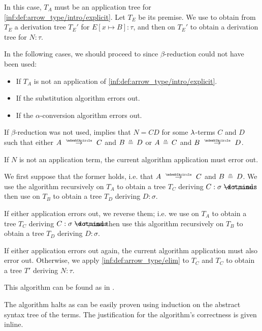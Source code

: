 \begin{algorithm}
\begin{thmenum}
\begin{thmenum}
      In this case, \( T_A \) must be an application tree for \ref{inf:def:arrow_type/intro/explicit}. Let \( T_E \) be its premise. We use  to obtain from \( T_E \) a derivation tree \( T_E' \) for \( E[x \mapsto B]: \tau \), and then  on \( T_E' \) to obtain a derivation tree for \( N: \tau \).

      In the following cases, we should proceed to  since \( \beta \)-reduction could not have been used:
      \begin{itemize}
        \item If \( T_A \) is not an application of \ref{inf:def:arrow_type/intro/explicit}.
        \item If the substitution algorithm errors out.
        \item If the \( \alpha \)-conversion algorithm errors out.
      \end{itemize}

       If \( \beta \)-reduction was not used,  implies that \( N = CD \) for some \( {\mathrm \lambda} \)-terms \( C \) and \( D \) such that either \( A \pred C \) and \( B \aequiv D \) or \( A \aequiv C \) and \( B \pred D \).

      If \( N \) is not an application term, the current algorithm application must error out.

      We first suppose that the former holds, i.e. that \( A \pred C \) and \( B \aequiv D \). We use the algorithm recursively on \( T_A \) to obtain a tree \( T_C \) deriving \( C: \sigma \synimplies \tau \), and then use  on \( T_B \) to obtain a tree \( T_D \) deriving \( D: \sigma \).

      If either application errors out, we reverse them; i.e. we use  on \( T_A \) to obtain a tree \( T_C \) deriving \( C: \sigma \synimplies \tau \), and then use this algorithm recursively on \( T_B \) to obtain a tree \( T_D \) deriving \( D: \sigma \).

      If either application errors out again, the current algorithm application must also error out. Otherwise, we apply \ref{inf:def:arrow_type/elim} to \( T_C \) and \( T_C \) to obtain a tree \( T' \) deriving \( N: \tau \).
    \end{thmenum}
  \end{thmenum}
\end{algorithm}
\begin{comments}
  \item This algorithm can be found as  in \cite{notebook:code}.
\end{comments}
\begin{defproof}
  The algorithm halts as can be easily proven using induction on the abstract syntax tree of the terms. The justification for the algorithm's correctness is given inline.
\end{defproof}

